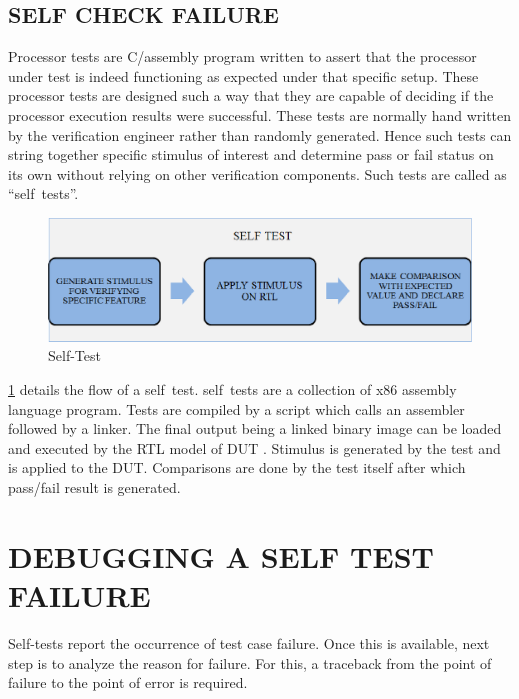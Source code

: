 \subsection {SELF CHECK FAILURE}

Processor tests are C/assembly program written to assert that the processor under test is indeed functioning as expected under that specific setup. These processor tests are designed such a way that they are capable of deciding if the processor execution results were successful. These tests are normally hand written by the verification engineer rather than randomly generated.  Hence such tests can string together specific stimulus of interest and determine pass or fail status on its own without relying on other verification components. Such tests are called as ``self~tests''.


\begin{figure}[h]
\centering
\includegraphics[scale=0.65]{./figures/selftest.eps}
\caption{Self-Test} 
\label{fig:selftest.ps}
\end{figure}

\figurename{\ref{fig:selftest.ps}} details the flow of a self~test. self~tests are a collection of x86 assembly language program. Tests are compiled by a script which calls an assembler followed by a linker. The final output being a linked binary image can be loaded and executed by the RTL model of DUT . Stimulus is generated by the test and is applied to the DUT. Comparisons are done by the test itself after which pass/fail result is generated.



\section{DEBUGGING A SELF TEST FAILURE}

Self-tests report the occurrence of test case failure. Once this is available, next step is to analyze the reason for failure.  For this, a traceback from the point of failure to the point of error is required. 

